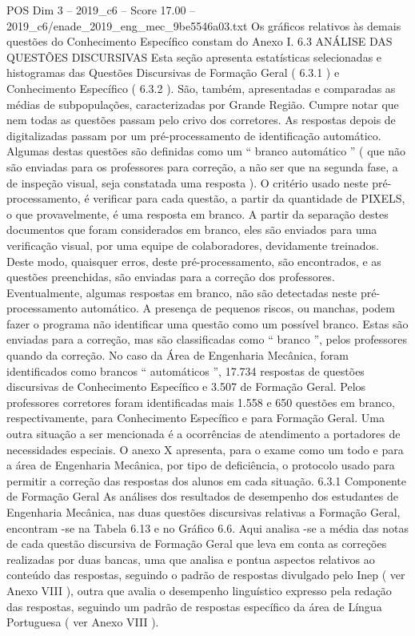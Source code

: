 \begin{textsample}{POS Dim 3 – 2019\_c6 – Score 17.00 – 2019\_c6/enade\_2019\_eng\_mec\_9be5546a03.txt}
Os gráficos relativos às demais questões do Conhecimento Específico constam do Anexo I. 6.3 ANÁLISE DAS QUESTÕES DISCURSIVAS Esta seção apresenta estatísticas selecionadas e histogramas das Questões Discursivas de Formação Geral ( 6.3.1 ) e Conhecimento Específico ( 6.3.2 ).
São, também, apresentadas e comparadas as médias de subpopulações, caracterizadas por Grande Região.
Cumpre notar que nem todas as questões passam pelo crivo dos corretores.
As respostas depois de digitalizadas passam por um pré-processamento de identificação automático.
Algumas destas questões são definidas como um “ branco automático ” ( que não são enviadas para os professores para correção, a não ser que na segunda fase, a de inspeção visual, seja constatada uma resposta ).
O critério usado neste pré-processamento, é verificar para cada questão, a partir da quantidade de PIXELS, o que provavelmente, é uma resposta em branco.
A partir da separação destes documentos que foram considerados em branco, eles são enviados para uma verificação visual, por uma equipe de colaboradores, devidamente treinados.
Deste modo, quaisquer erros, deste pré-processamento, são encontrados, e as questões preenchidas, são enviadas para a correção dos professores.
Eventualmente, algumas respostas em branco, não são detectadas neste pré-processamento automático.
A presença de pequenos riscos, ou manchas, podem fazer o programa não identificar uma questão como um possível branco.
Estas são enviadas para a correção, mas são classificadas como “ branco ”, pelos professores quando da correção.
No caso da Área de Engenharia Mecânica, foram identificados como brancos “ automáticos ”, 17.734 respostas de questões discursivas de Conhecimento Específico e 3.507 de Formação Geral.
Pelos professores corretores foram identificadas mais 1.558 e 650 questões em branco, respectivamente, para Conhecimento Específico e para Formação Geral.
Uma outra situação a ser mencionada é a ocorrências de atendimento a portadores de necessidades especiais.
O anexo X apresenta, para o exame como um todo e para a área de Engenharia Mecânica, por tipo de deficiência, o protocolo usado para permitir a correção das respostas dos alunos em cada situação. 6.3.1 Componente de Formação Geral As análises dos resultados de desempenho dos estudantes de Engenharia Mecânica, nas duas questões discursivas relativas a Formação Geral, encontram -se na Tabela 6.13 e no Gráfico 6.6.
Aqui analisa -se a média das notas de cada questão discursiva de Formação Geral que leva em conta as correções realizadas por duas bancas, uma que analisa e pontua aspectos relativos ao conteúdo das respostas, seguindo o padrão de respostas divulgado pelo Inep ( ver Anexo VIII ), outra que avalia o desempenho linguístico expresso pela redação das respostas, seguindo um padrão de respostas específico da área de Língua Portuguesa ( ver Anexo VIII ).

\end{textsample}
